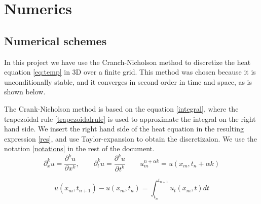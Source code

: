 \chapter{Numerics}

\section{Numerical schemes}

In this project we have use the Cranch-Nicholson method to discretize the heat
equation \cref{eq:temp} in 3D over a finite grid. This method was chosen because
it is unconditionally stable, and it converges in second order in time and space, as is shown below.


The Crank-Nicholson method is based on the equation \cref{integral}, where the trapezoidal rule \cref{trapezoidalrule} is used to approximate the integral on the right hand side. We insert the right hand side of the heat equation in the resulting expression \cref{res}, and use Taylor-expansion to obtain the discretizaion. We use the notation \cref{notations} in the rest of the document.
\begin{equation}
\partial_{x}^{k}u=\frac{\partial^{k}u}{\partial^{}x^{k}},\quad \quad \partial_{t}^{k}u=\frac{\partial^{k}u}{\partial^{}t^{k}} \quad \quad u_{m}^{n+\alpha k } = u(x_{m},t_{n}+\alpha k)
\label{notations}
\end{equation}

\begin{equation}
u(x_m,t_{n+1}) - u(x_m,t_n) = \int_{t_n} ^{t_{n+1}} u_t(x_m,t) dt
\label{integral}
\end{equation}

